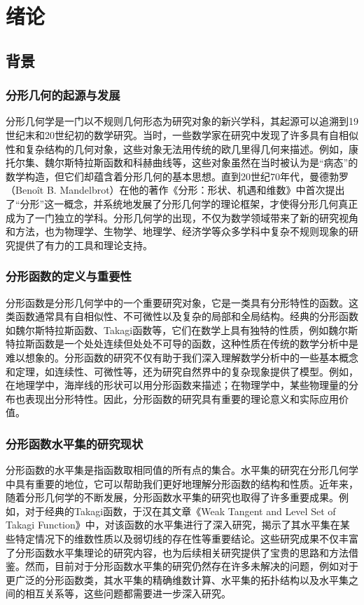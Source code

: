 \cleardoublepage

\section{绪论}

\subsection{背景}

\subsubsection{分形几何的起源与发展}

分形几何学是一门以不规则几何形态为研究对象的新兴学科，其起源可以追溯到19世纪末和20世纪初的数学研究。当时，一些数学家在研究中发现了许多具有自相似性和复杂结构的几何对象，这些对象无法用传统的欧几里得几何来描述。例如，康托尔集、魏尔斯特拉斯函数和科赫曲线等，这些对象虽然在当时被认为是“病态”的数学构造，但它们却蕴含着分形几何的基本思想。直到20世纪70年代，曼德勃罗（Benoît B. Mandelbrot）在他的著作《分形：形状、机遇和维数》中首次提出了“分形”这一概念，并系统地发展了分形几何学的理论框架，才使得分形几何真正成为了一门独立的学科。分形几何学的出现，不仅为数学领域带来了新的研究视角和方法，也为物理学、生物学、地理学、经济学等众多学科中复杂不规则现象的研究提供了有力的工具和理论支持。

\subsubsection{分形函数的定义与重要性}

分形函数是分形几何学中的一个重要研究对象，它是一类具有分形特性的函数。这类函数通常具有自相似性、不可微性以及复杂的局部和全局结构。经典的分形函数如魏尔斯特拉斯函数、Takagi函数等，它们在数学上具有独特的性质，例如魏尔斯特拉斯函数是一个处处连续但处处不可导的函数，这种性质在传统的数学分析中是难以想象的。分形函数的研究不仅有助于我们深入理解数学分析中的一些基本概念和定理，如连续性、可微性等，还为研究自然界中的复杂现象提供了模型。例如，在地理学中，海岸线的形状可以用分形函数来描述；在物理学中，某些物理量的分布也表现出分形特性。因此，分形函数的研究具有重要的理论意义和实际应用价值。

\subsubsection{分形函数水平集的研究现状}

分形函数的水平集是指函数取相同值的所有点的集合。水平集的研究在分形几何学中具有重要的地位，它可以帮助我们更好地理解分形函数的结构和性质。近年来，随着分形几何学的不断发展，分形函数水平集的研究也取得了许多重要成果。例如，对于经典的Takagi函数，于汉在其文章《Weak Tangent and Level Set of Takagi Function》中，对该函数的水平集进行了深入研究，揭示了其水平集在某些特定情况下的维数性质以及弱切线的存在性等重要结论。这些研究成果不仅丰富了分形函数水平集理论的研究内容，也为后续相关研究提供了宝贵的思路和方法借鉴。然而，目前对于分形函数水平集的研究仍然存在许多未解决的问题，例如对于更广泛的分形函数类，其水平集的精确维数计算、水平集的拓扑结构以及水平集之间的相互关系等，这些问题都需要进一步深入研究。

